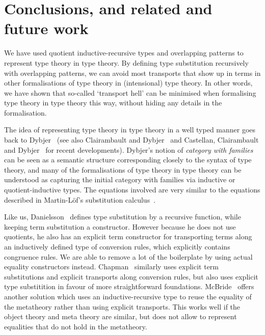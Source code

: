 \documentclass[a4paper,UKenglish,numberwithinsect,cleveref,thm-restate]{lipics-v2021}
\newcommand{\LT}[2][]{\todo[inline,author={L-T},caption={},color={pink},#1]{#2}}
\begin{document}
\LT{Mention the NbE for SC here}

\section{Conclusions, and related and future work}\label{sec:conclusion}

We have used quotient inductive-recursive types and overlapping
patterns to represent type theory in type theory. By defining type
substitution recursively with overlapping patterns, we can avoid most
transports that show up in terms in other formalisations of type
theory in (intensional) type theory. In other words, we have shown that so-called
`transport hell' can be minimised when formalising type theory in type
theory this way, without hiding any details in the formalisation.


The idea of representing type theory in type theory in a well typed manner goes back to Dybjer~\cite{Dybjer1996} (see also Clairambault and Dybjer~\cite{Clairambault2014} and Castellan, Clairambault and Dybjer~\cite{Castellan2021} for recent developments). Dybjer's notion of \emph{category with families} can be seen as a semantic structure corresponding closely to the syntax of type theory, and many of the formalisations of type theory in type theory can be understood as capturing the initial category with families via inductive or quotient-inductive types. The equations involved are very similar to the equations described in Martin-L\"of's substitution calculus~\cite{Martin-Lof1992}.

Like us, Danielsson~\cite{Danielsson2006} defines type substitution by a recursive function, while keeping term substitution a constructor. However because he does not use quotients, he also has an explicit term constructor for transporting terms along an inductively defined type of conversion rules, which explicitly contains congruence rules. We are able to remove a lot of the boilerplate by using actual equality constructors instead. Chapman~\cite{Chapman2009} similarly uses explicit term substitutions and explicit transports along conversion rules, but also uses explicit type substitition in favour of more straightforward foundations.
McBride~\cite{McBride2010} offers another solution which uses an inductive-recursive type to reuse the equality of the metatheory rather than using explicit transports. This works well if the object theory and meta theory are similar, but does not allow to represent equalities that do not hold in the metatheory.
\end{document}
